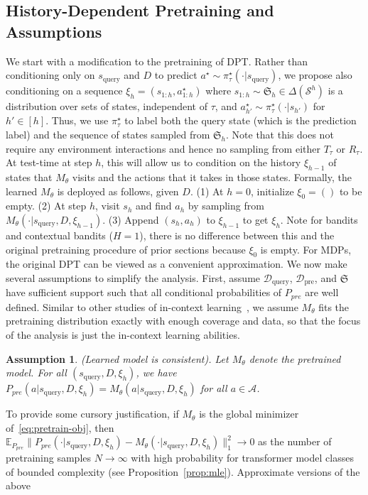 \documentclass{article}
\newcommand{\Acal}{\mathcal{A}}
\newcommand{\Dcal}{\mathcal{D}}
\newcommand{\Scal}{{\mathcal{S}}}
\newcommand{\E}{\mathbb{E}}
\newcommand{\Sfrak}{{\mathfrak{S}}}
\newcommand{\pretraind}{\Dcal_{\text{pre}}}
\newcommand{\macroName}{DPT}
\newcommand{\squery}{s_{\text{query}}}
\newcommand{\Dquery}{\Dcal_{\text{query}}}
\newcommand{\pistar}{\pi^{\star}}
\newtheorem{assumption}{Assumption}[]
\begin{document}
\subsection{History-Dependent Pretraining and Assumptions}
We start with a modification to the pretraining of \macroName{}. Rather than conditioning only on $\squery$ and $D$ to predict $a^\star \sim \pistar_\tau(\cdot | \squery)$, we propose also conditioning on a sequence $\xi_{h} = (s_{1:h}, a_{1:h}^\star)$ where $s_{1:h} \sim \Sfrak_h \in \Delta(\Scal^h)$ is a distribution over sets of states, independent of $\tau$, and $a^\star_{h'} \sim \pistar_\tau(\cdot | s_{h'})$ for $h ' \in [h]$. Thus, we use $\pistar_\tau$ to label both the query state (which is the prediction label) and the sequence of states sampled from $\Sfrak_h$. Note that this does not require any environment interactions and hence no sampling from either $T_\tau$ or $R_\tau$.
At test-time at step $h$, this will allow us to condition on the history $\xi_{h - 1}$ of states that $M_{\theta}$ visits and the actions that it takes in those states. Formally, the learned $M_{\theta}$ is deployed as follows, given $D$.
    (1) At $h = 0$, initialize $\xi_0 = ()$ to be empty.
    (2) At step $h$, visit $s_h$ and find $a_h$ by sampling from  $M_{\theta}(\cdot | \squery, D, \xi_{h- 1})$.
    (3) Append $(s_h, a_h)$ to $\xi_{h -1}$ to get $\xi_h$.
Note for bandits and contextual bandits ($H = 1$), there is no difference between this and the original pretraining procedure of prior sections because $\xi_0$ is empty. For MDPs, the original DPT can be viewed as a convenient approximation.
We now make several assumptions to simplify the analysis. First, assume $\Dquery$, $\pretraind$, and $\Sfrak$ have sufficient support such that all conditional probabilities of $P_{pre}$ are well defined. Similar to other studies of in-context learning~\citep{xie2021explanation}, we assume $M_{\theta}$ fits the pretraining distribution exactly with enough coverage and data, so that the focus of the analysis is just the in-context learning abilities.
\begin{assumption}\label{asmp:equality}
(Learned model is consistent). Let $M_{\theta}$ denote the pretrained model. For all $(\squery, D, \xi_h)$,
we have $P_{pre}(a | \squery, D, \xi_h) = M_{\theta}( a | \squery, D, \xi_h)$ for all $a \in \Acal$.
\end{assumption}
To provide some cursory justification, if $M_{\theta}$ is the global minimizer of~\eqref{eq:pretrain-obj}, then $\E_{P_{pre}} \| P_{pre}(\cdot |\squery,  D, \xi_h)  - M_{\theta}(\cdot |  \squery, D, \xi_h) \|_1^2 \rightarrow  0$ as the number of pretraining samples $N \rightarrow \infty$ with high probability for transformer model classes of bounded complexity (see Proposition~\ref{prop:mle}). Approximate versions of the above
\end{document}
